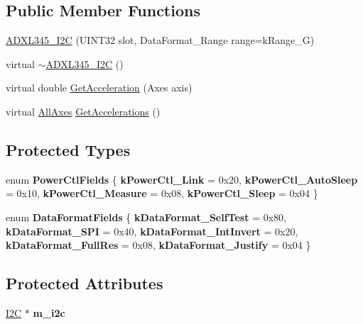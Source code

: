 \subsection*{\-Public \-Member \-Functions}
\begin{DoxyCompactItemize}
\item 
\hyperlink{classADXL345__I2C_a6058a2534acec44c03d3b6f56198f60c}{\-A\-D\-X\-L345\-\_\-\-I2\-C} (\-U\-I\-N\-T32 slot, \-Data\-Format\-\_\-\-Range range=k\-Range\-\_\-G)
\item 
virtual \hyperlink{classADXL345__I2C_a3d56f96d66939a5cd6abbadaf94bcaae}{$\sim$\-A\-D\-X\-L345\-\_\-\-I2\-C} ()
\item 
virtual double \hyperlink{classADXL345__I2C_abc3a0bb889882e01cee781e3ab33af84}{\-Get\-Acceleration} (\-Axes axis)
\item 
virtual \hyperlink{structADXL345__I2C_1_1AllAxes}{\-All\-Axes} \hyperlink{classADXL345__I2C_a6c36866e36c57e3aefd9ddc5685bcb2a}{\-Get\-Accelerations} ()
\end{DoxyCompactItemize}
\subsection*{\-Protected \-Types}
\begin{DoxyCompactItemize}
\item 
enum {\bfseries \-Power\-Ctl\-Fields} \{ {\bfseries k\-Power\-Ctl\-\_\-\-Link} = 0x20, 
{\bfseries k\-Power\-Ctl\-\_\-\-Auto\-Sleep} = 0x10, 
{\bfseries k\-Power\-Ctl\-\_\-\-Measure} = 0x08, 
{\bfseries k\-Power\-Ctl\-\_\-\-Sleep} = 0x04
 \}
\item 
enum {\bfseries \-Data\-Format\-Fields} \{ \*
{\bfseries k\-Data\-Format\-\_\-\-Self\-Test} = 0x80, 
{\bfseries k\-Data\-Format\-\_\-\-S\-P\-I} = 0x40, 
{\bfseries k\-Data\-Format\-\_\-\-Int\-Invert} = 0x20, 
{\bfseries k\-Data\-Format\-\_\-\-Full\-Res} = 0x08, 
\*
{\bfseries k\-Data\-Format\-\_\-\-Justify} = 0x04
 \}
\end{DoxyCompactItemize}
\subsection*{\-Protected \-Attributes}
\begin{DoxyCompactItemize}
\item 
\hypertarget{classADXL345__I2C_a714765b5abc21ebffed4c28c18017f6a}{\hyperlink{classI2C}{\-I2\-C} $\ast$ {\bfseries m\-\_\-i2c}}\label{classADXL345__I2C_a714765b5abc21ebffed4c28c18017f6a}

\end{DoxyCompactItemize}
